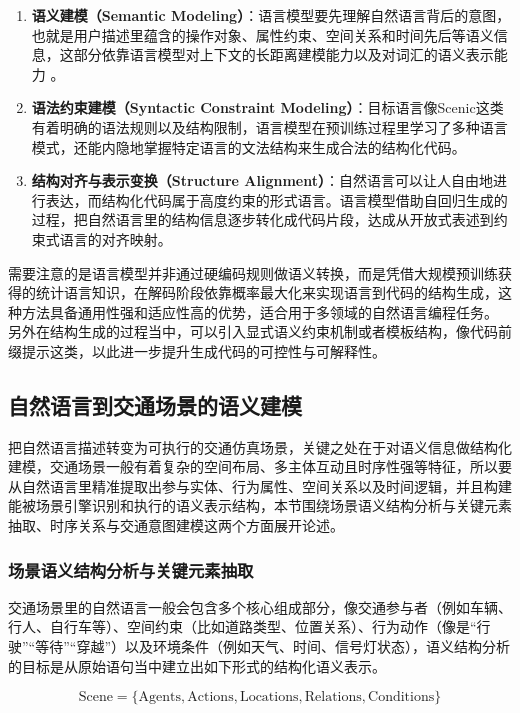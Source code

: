 \begin{enumerate}
	\item \textbf{语义建模（Semantic Modeling）}：语言模型要先理解自然语言背后的意图，也就是用户描述里蕴含的操作对象、属性约束、空间关系和时间先后等语义信息，这部分依靠语言模型对上下文的长距离建模能力以及对词汇的语义表示能力 。
	
	\item \textbf{语法约束建模（Syntactic Constraint Modeling）}：目标语言像Scenic这类有着明确的语法规则以及结构限制，语言模型在预训练过程里学习了多种语言模式，还能内隐地掌握特定语言的文法结构来生成合法的结构化代码。
	
	\item \textbf{结构对齐与表示变换（Structure Alignment）}：自然语言可以让人自由地进行表达，而结构化代码属于高度约束的形式语言。语言模型借助自回归生成的过程，把自然语言里的结构信息逐步转化成代码片段，达成从开放式表述到约束式语言的对齐映射。
\end{enumerate}

需要注意的是语言模型并非通过硬编码规则做语义转换，而是凭借大规模预训练获得的统计语言知识，在解码阶段依靠概率最大化来实现语言到代码的结构生成，这种方法具备通用性强和适应性高的优势，适合用于多领域的自然语言编程任务。
另外在结构生成的过程当中，可以引入显式语义约束机制或者模板结构，像代码前缀提示这类，以此进一步提升生成代码的可控性与可解释性。
\subsection{自然语言到交通场景的语义建模}

把自然语言描述转变为可执行的交通仿真场景，关键之处在于对语义信息做结构化建模，交通场景一般有着复杂的空间布局、多主体互动且时序性强等特征，所以要从自然语言里精准提取出参与实体、行为属性、空间关系以及时间逻辑，并且构建能被场景引擎识别和执行的语义表示结构，本节围绕场景语义结构分析与关键元素抽取、时序关系与交通意图建模这两个方面展开论述。

\subsubsection{场景语义结构分析与关键元素抽取}

交通场景里的自然语言一般会包含多个核心组成部分，像交通参与者（例如车辆、行人、自行车等）、空间约束（比如道路类型、位置关系）、行为动作（像是“行驶”“等待”“穿越”）以及环境条件（例如天气、时间、信号灯状态），语义结构分析的目标是从原始语句当中建立出如下形式的结构化语义表示。

\begin{equation}
	\text{Scene} = \{ \text{Agents}, \text{Actions}, \text{Locations}, \text{Relations}, \text{Conditions} \}
\end{equation}

